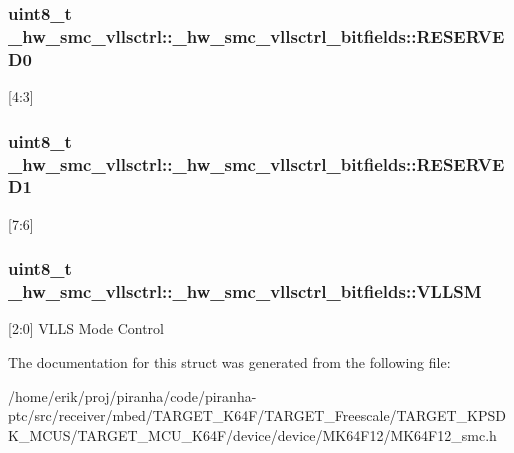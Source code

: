 \subsubsection[{\texorpdfstring{R\+E\+S\+E\+R\+V\+E\+D0}{RESERVED0}}]{\setlength{\rightskip}{0pt plus 5cm}uint8\+\_\+t \+\_\+hw\+\_\+smc\+\_\+vllsctrl\+::\+\_\+hw\+\_\+smc\+\_\+vllsctrl\+\_\+bitfields\+::\+R\+E\+S\+E\+R\+V\+E\+D0}\hypertarget{struct__hw__smc__vllsctrl_1_1__hw__smc__vllsctrl__bitfields_ac4d847389703eed9c098ada44151ab7f}{}\label{struct__hw__smc__vllsctrl_1_1__hw__smc__vllsctrl__bitfields_ac4d847389703eed9c098ada44151ab7f}
\mbox{[}4\+:3\mbox{]} 
\subsubsection[{\texorpdfstring{R\+E\+S\+E\+R\+V\+E\+D1}{RESERVED1}}]{\setlength{\rightskip}{0pt plus 5cm}uint8\+\_\+t \+\_\+hw\+\_\+smc\+\_\+vllsctrl\+::\+\_\+hw\+\_\+smc\+\_\+vllsctrl\+\_\+bitfields\+::\+R\+E\+S\+E\+R\+V\+E\+D1}\hypertarget{struct__hw__smc__vllsctrl_1_1__hw__smc__vllsctrl__bitfields_a79eb9a6dd3da28183e6a4a1213e41d5a}{}\label{struct__hw__smc__vllsctrl_1_1__hw__smc__vllsctrl__bitfields_a79eb9a6dd3da28183e6a4a1213e41d5a}
\mbox{[}7\+:6\mbox{]} 
\subsubsection[{\texorpdfstring{V\+L\+L\+SM}{VLLSM}}]{\setlength{\rightskip}{0pt plus 5cm}uint8\+\_\+t \+\_\+hw\+\_\+smc\+\_\+vllsctrl\+::\+\_\+hw\+\_\+smc\+\_\+vllsctrl\+\_\+bitfields\+::\+V\+L\+L\+SM}\hypertarget{struct__hw__smc__vllsctrl_1_1__hw__smc__vllsctrl__bitfields_a4f2c44d155fc3a50d12843183e92e6b3}{}\label{struct__hw__smc__vllsctrl_1_1__hw__smc__vllsctrl__bitfields_a4f2c44d155fc3a50d12843183e92e6b3}
\mbox{[}2\+:0\mbox{]} V\+L\+LS Mode Control 

The documentation for this struct was generated from the following file\+:\begin{DoxyCompactItemize}
\item 
/home/erik/proj/piranha/code/piranha-\/ptc/src/receiver/mbed/\+T\+A\+R\+G\+E\+T\+\_\+\+K64\+F/\+T\+A\+R\+G\+E\+T\+\_\+\+Freescale/\+T\+A\+R\+G\+E\+T\+\_\+\+K\+P\+S\+D\+K\+\_\+\+M\+C\+U\+S/\+T\+A\+R\+G\+E\+T\+\_\+\+M\+C\+U\+\_\+\+K64\+F/device/device/\+M\+K64\+F12/M\+K64\+F12\+\_\+smc.\+h\end{DoxyCompactItemize}
